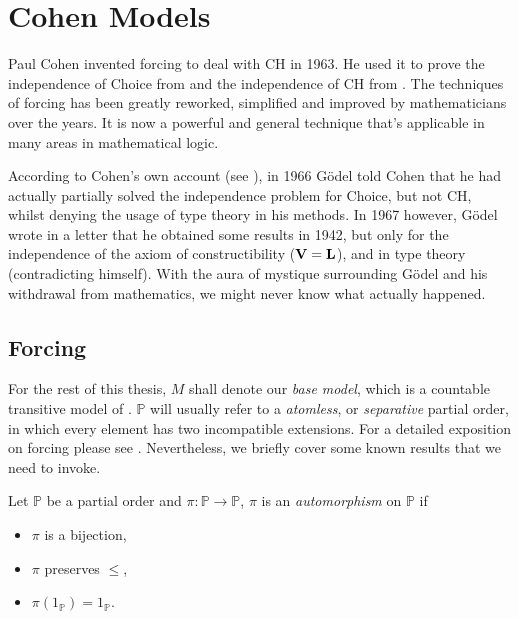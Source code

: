 \chapter{Cohen Models}

Paul Cohen invented forcing to deal with CH in 1963.
He used it to prove the independence of Choice from \ZF and the independence of CH from \ZFC.
The techniques of forcing has been greatly reworked, simplified and improved by mathematicians over the years.
It is now a powerful and general technique that's applicable in many areas in mathematical logic.

According to Cohen's own account (see \autocite[1087]{cohen2002}),
in 1966 Gödel told Cohen that he had actually partially solved the independence problem for Choice, but not CH,
whilst denying the usage of type theory in his methods.
In 1967 however, Gödel wrote in a letter that he obtained some results in 1942,
but only for the independence of the axiom of constructibility (\(\mathbf{V} = \mathbf{L}\)), and in type theory (contradicting himself).
With the aura of mystique surrounding Gödel and his withdrawal from mathematics, we might never know what actually happened.

\section{Forcing}
\renewcommand*{\P}{{\mathbb{P}}}
\newcommand*{\forces}{\Vdash}

For the rest of this thesis, \(M\) shall denote our \emph{base model}, which is a countable transitive model of \ZFC.
\(\P\) will usually refer to a \emph{atomless}, or \emph{separative} partial order, in which every element has two incompatible extensions.
For a detailed exposition on forcing please see \autocite{kunen1980}.
Nevertheless, we briefly cover some known results that we need to invoke.

\begin{definition}
    Let \(\P\) be a partial order and \(\pi: \P\to\P\),
    \(\pi\) is an \emph{automorphism} on \(\P\) if
    \begin{itemize}
        \item \(\pi\) is a bijection,
        \item \(\pi\) preserves \(\leq\),
        \item \(\pi(1_{\P}) = 1_\P\).
    \end{itemize}
\end{definition}

